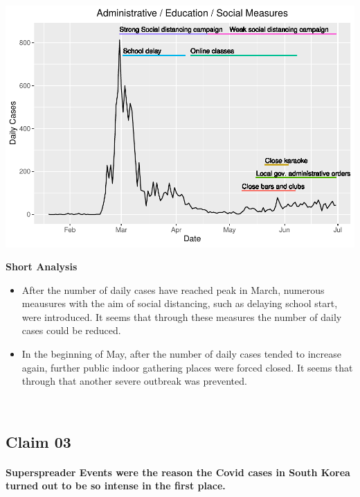 \documentclass[
]{article}
\providecommand{\tightlist}{%
  \setlength{\itemsep}{0pt}\setlength{\parskip}{0pt}}
\begin{document}
~

\includegraphics{Main_Analysis_files/figure-latex/unnamed-chunk-14-1.pdf}

\textbf{Short Analysis}

\begin{itemize}
\tightlist
\item
  After the number of daily cases have reached peak in March, numerous
  meausures with the aim of social distancing, such as delaying school
  start, were introduced. It seems that through these measures the
  number of daily cases could be reduced.
\item
  In the beginning of May, after the number of daily cases tended to
  increase again, further public indoor gathering places were forced
  closed. It seems that through that another severe outbreak was
  prevented.
\end{itemize}

~

\hypertarget{claim-03}{%
\subsection{Claim 03}\label{claim-03}}

\hypertarget{superspreader-events-were-the-reason-the-covid-cases-in-south-korea-turned-out-to-be-so-intense-in-the-first-place.}{%
\paragraph{Superspreader Events were the reason the Covid cases in South
Korea turned out to be so intense in the first
place.}\label{superspreader-events-were-the-reason-the-covid-cases-in-south-korea-turned-out-to-be-so-intense-in-the-first-place.}}
\end{document}
